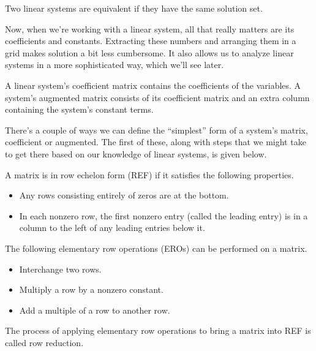 \documentclass[../m073main.tex]{subfiles}
\begin{document}
\begin{definition}
	Two linear systems are equivalent if they have the same solution set.
\end{definition}

Now, when we're working with a linear system, all that really matters are its coefficients and constants.
Extracting these numbers and arranging them in a grid makes solution a bit less cumbersome.
It also allows us to analyze linear systems in a more sophisticated way, which we'll see later.

\begin{definition}
	A linear system's coefficient matrix contains the coefficients of the variables.
	A system's augmented matrix consists of its coefficient matrix and an extra column containing the system's constant terms.
\end{definition}

There's a couple of ways we can define the ``simplest'' form of a system's matrix, coefficient or augmented.
The first of these, along with steps that we might take to get there based on our knowledge of linear systems, is given below.

\begin{definition}
	A matrix is in row echelon form (REF) if it satisfies the following properties.
	\begin{itemize}
		\item Any rows consisting entirely of zeros are at the bottom.
		\item In each nonzero row, the first nonzero entry (called the leading entry) is in a column to the left of any leading entries below it.
	\end{itemize}
\end{definition}

\begin{definition}
	The following elementary row operations (EROs) can be performed on a matrix.
	\begin{itemize}
		\item Interchange two rows.
		\item Multiply a row by a nonzero constant.
		\item Add a multiple of a row to another row.
	\end{itemize}
	The process of applying elementary row operations to bring a matrix into REF is called row reduction.
\end{definition}
\end{document}
